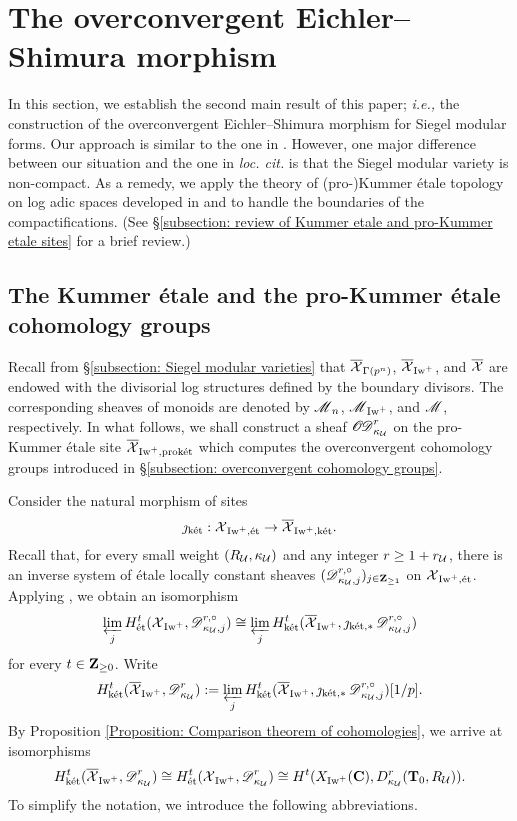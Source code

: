 \section{The overconvergent Eichler--Shimura morphism}\label{section:EichlerShimura}
In this section, we establish the second main result of this paper; {\it i.e.,} the construction of the overconvergent Eichler--Shimura morphism for Siegel modular forms. Our approach is similar to the one in \cite{CHJ-2017}. However, one major difference between our situation and the one in \emph{loc. cit.} is that the Siegel modular variety is non-compact. As a remedy, we apply the theory of (pro-)Kummer \'etale topology on log adic spaces developed in \cite{Diao} and \cite{Diao-Lan-Liu-Zhu} to handle the boundaries of the compactifications. (See \S \ref{subsection: review of Kummer etale and pro-Kummer etale sites} for a brief review.)


\subsection{The Kummer \'{e}tale and the pro-Kummer \'{e}tale cohomology groups}\label{subsection: pro-Kummer etale cohomology groups}

Recall from \S \ref{subsection: Siegel modular varieties} that $\overline{\calX}_{\Gamma(p^n)}$, $\overline{\calX}_{\Iw^+}$, and $\overline{\calX}$ are endowed with the divisorial log structures defined by the boundary divisors. The corresponding sheaves of monoids are denoted by $\scrM_n$, $\scrM_{\Iw^+}$, and $\scrM$, respectively. In what follows, we shall construct a sheaf $\sheafOD_{\kappa_{\calU}}^r$ on the pro-Kummer \'{e}tale site $\overline{\calX}_{\Iw^+, \proket}$ which computes the overconvergent cohomology groups introduced in \S \ref{subsection: overconvergent cohomology groups}. 

Consider the natural morphism of sites \[\jmath_{\ket}: \calX_{\Iw^+, \et}\rightarrow \overline{\calX}_{\Iw^+, \ket}.\]
Recall that, for every small weight $(R_{\calU}, \kappa_{\calU})$ and any integer $r\geq 1+r_{\calU}$, there is an inverse system of \'{e}tale locally constant sheaves $(\scrD_{\kappa_{\calU}, j}^{r, \circ})_{j\in \Z_{\geq 1}}$ on $\calX_{\Iw^+, \et}$. Applying \cite[Corollary 4.6.7]{Diao}, we obtain an isomorphism $$\varprojlim_{j}H_{\et}^t(\calX_{\Iw^+}, \scrD_{\kappa_{\calU}, j}^{r, \circ})\cong \varprojlim_{j} H_{\ket}^{t}(\overline{\calX}_{\Iw^+}, \jmath_{\ket, *}\scrD_{\kappa_{\calU}, j}^{r, \circ})$$ for every $t\in \Z_{\geq 0}$. Write \[H_{\ket}^t(\overline{\calX}_{\Iw^+}, \scrD_{\kappa_{\calU}}^r):=\varprojlim_{j} H_{\ket}^{t}(\overline{\calX}_{\Iw^+}, \jmath_{\ket, *}\scrD_{\kappa_{\calU}, j}^{r, \circ})[1/p].\] By Proposition \ref{Proposition: Comparison theorem of cohomologies}, we arrive at isomorphisms $$H_{\ket}^t(\overline{\calX}_{\Iw^+}, \scrD_{\kappa_{\calU}}^{r})\cong H_{\et}^t(\calX_{\Iw^+}, \scrD_{\kappa_{\calU}}^{r})\cong H^t(X_{\Iw^+}(\C), D_{\kappa_{\calU}}^{r}(\T_0, R_{\calU})).$$ To simplify the notation, we introduce the following abbreviations. 

